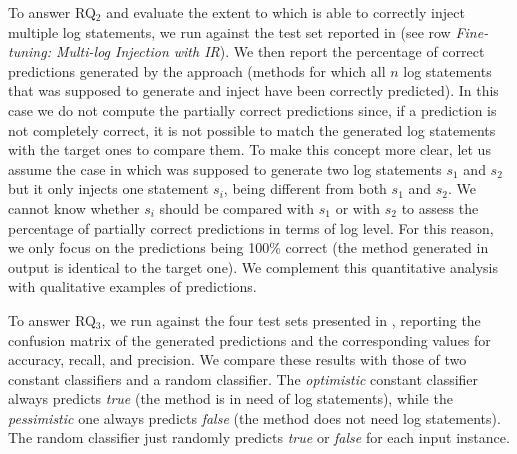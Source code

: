 To answer RQ$_2$ and evaluate the extent to which \approach is able to correctly inject multiple log statements, we run \approach against the test set reported in  (see row \emph{Fine-tuning: Multi-log Injection with IR}). We then report the percentage of correct predictions generated by the approach (\ie methods for which all $n$ log statements that \approach was supposed to generate and inject have been correctly predicted). In this case we do not compute the partially correct predictions since, if a prediction is not completely correct, it is not possible to match the generated log statements with the target ones to compare them. To make this concept more clear, let us assume the case in which \approach was supposed to generate two log statements $s_1$ and $s_2$ but it only injects one statement $s_i$, being different from both $s_1$ and $s_2$. We cannot know whether $s_i$ should be compared with $s_1$ or with $s_2$ to assess the percentage of partially correct predictions in terms of \eg log level. For this reason, we only focus on the predictions being 100\% correct (\ie the method generated in output is identical to the target one). We complement this quantitative analysis with qualitative examples of predictions.

To answer RQ$_3$, we run \approach against the four test sets presented in , reporting the confusion matrix of the generated predictions and the corresponding values for accuracy, recall, and precision. We compare these results with those of two constant classifiers and a random classifier. The \emph{optimistic} constant classifier always predicts \emph{true} (\ie the method is in need of log statements), while the \emph{pessimistic} one always predicts \emph{false} (\ie the method does not need log statements). The random classifier just randomly predicts \emph{true} or \emph{false} for each input instance. 